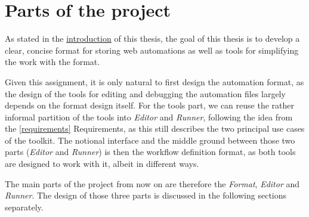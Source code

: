 \section{Parts of the project}

As stated in the \hyperref[intro]{introduction} of this thesis, the goal of this thesis is to develop a clear, concise format for storing web automations
as well as tools for simplifying the work with the format. 

Given this assignment, it is only natural to first design the automation format, as the design of the tools for editing and debugging the automation files
largely depends on the format design itself. 
For the tools part, we can reuse the rather informal partition of the tools into \textit{Editor} and \textit{Runner}, following the idea from the \autoref{requirements} Requirements, 
as this still describes the two principal use cases of the toolkit.
The notional interface and the middle ground between those two parts (\textit{Editor} and \textit{Runner}) is then the workflow definition format, as both tools are designed to work with it, albeit in different ways.

The main parts of the project from now on are therefore the \textit{Format}, \textit{Editor} and \textit{Runner}.
The design of those three parts is discussed in the following sections separately.